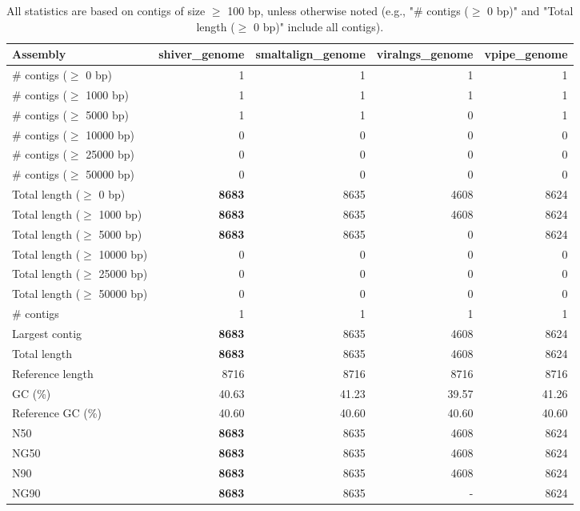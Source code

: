\documentclass[12pt,a4paper]{article}
\begin{document}
\begin{table}[ht]
\begin{center}
\caption{All statistics are based on contigs of size $\geq$ 100 bp, unless otherwise noted (e.g., "\# contigs ($\geq$ 0 bp)" and "Total length ($\geq$ 0 bp)" include all contigs).}
\begin{tabular}{|l*{4}{|r}|}
\hline
Assembly & shiver\_genome & smaltalign\_genome & viralngs\_genome & vpipe\_genome \\ \hline
\# contigs ($\geq$ 0 bp) & 1 & 1 & 1 & 1 \\ \hline
\# contigs ($\geq$ 1000 bp) & 1 & 1 & 1 & 1 \\ \hline
\# contigs ($\geq$ 5000 bp) & 1 & 1 & 0 & 1 \\ \hline
\# contigs ($\geq$ 10000 bp) & 0 & 0 & 0 & 0 \\ \hline
\# contigs ($\geq$ 25000 bp) & 0 & 0 & 0 & 0 \\ \hline
\# contigs ($\geq$ 50000 bp) & 0 & 0 & 0 & 0 \\ \hline
Total length ($\geq$ 0 bp) & {\bf 8683} & 8635 & 4608 & 8624 \\ \hline
Total length ($\geq$ 1000 bp) & {\bf 8683} & 8635 & 4608 & 8624 \\ \hline
Total length ($\geq$ 5000 bp) & {\bf 8683} & 8635 & 0 & 8624 \\ \hline
Total length ($\geq$ 10000 bp) & 0 & 0 & 0 & 0 \\ \hline
Total length ($\geq$ 25000 bp) & 0 & 0 & 0 & 0 \\ \hline
Total length ($\geq$ 50000 bp) & 0 & 0 & 0 & 0 \\ \hline
\# contigs & 1 & 1 & 1 & 1 \\ \hline
Largest contig & {\bf 8683} & 8635 & 4608 & 8624 \\ \hline
Total length & {\bf 8683} & 8635 & 4608 & 8624 \\ \hline
Reference length & 8716 & 8716 & 8716 & 8716 \\ \hline
GC (\%) & 40.63 & 41.23 & 39.57 & 41.26 \\ \hline
Reference GC (\%) & 40.60 & 40.60 & 40.60 & 40.60 \\ \hline
N50 & {\bf 8683} & 8635 & 4608 & 8624 \\ \hline
NG50 & {\bf 8683} & 8635 & 4608 & 8624 \\ \hline
N90 & {\bf 8683} & 8635 & 4608 & 8624 \\ \hline
NG90 & {\bf 8683} & 8635 & - & 8624 \\ \hline

\end{tabular}
\end{center}
\end{table}
\end{document}
